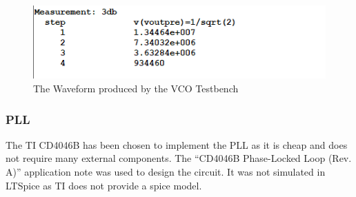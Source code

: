 \begin{figure}[H]
    \centering 
    \includegraphics[width=\textwidth]{../Circuits/Images/Pre-Amp/TestBenchOutput}
    \caption{The Waveform produced by the VCO Testbench}
    \label{fig:preAmpTestBenchOutput}
\end{figure}

\subsubsection{PLL}
The TI CD4046B has been chosen to implement the PLL as it is cheap and does not require many external components. 
The ``CD4046B Phase-Locked Loop (Rev. A)'' application note was used to design the circuit. 
It was not simulated in LTSpice as TI does not provide a spice model.
